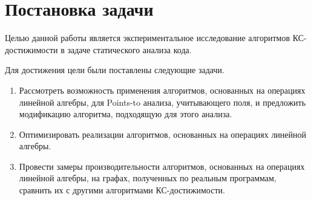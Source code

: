 \section{Постановка задачи}
Целью данной работы является экспериментальное исследование алгоритмов КС-достижимости в задаче статического анализа кода.

Для достижения цели были поставлены следующие задачи.

\begin{enumerate}
    \item Рассмотреть возможность применения алгоритмов, основанных на операциях линейной алгебры, для Points-to анализа, учитывающего поля, и предложить модификацию алгоритма, подходящую для этого анализа.
    \item Оптимизировать реализации алгоритмов, основанных на операциях линейной алгебры.
    \item Провести замеры производительности алгоритмов, основанных на операциях линейной алгебры, на графах, полученных по реальным программам, сравнить их с другими алгоритмами КС-достижимости.
\end{enumerate}
